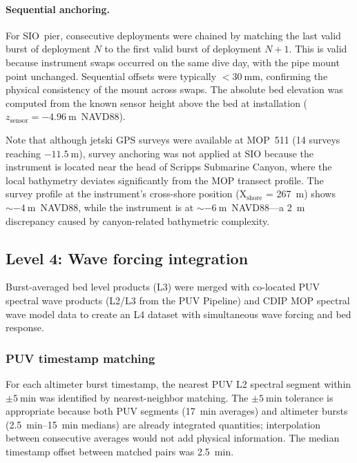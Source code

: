 \paragraph{Sequential anchoring.} For SIO~pier, consecutive deployments
were chained by matching the last valid burst of deployment $N$ to the
first valid burst of deployment $N{+}1$. This is valid because
instrument swaps occurred on the same dive day, with the pipe mount
point unchanged. Sequential offsets were typically
$< \SI{30}{\milli\meter}$, confirming the physical consistency of the
mount across swaps. The absolute bed elevation was computed from the
known sensor height above the bed at installation
($z_\text{sensor} = \SI{-4.96}{\meter}$~NAVD88).

Note that although jetski GPS surveys were available at MOP~511 (14
surveys reaching $-\SI{11.5}{\meter}$), survey anchoring was not
applied at SIO because the instrument is located near the head of
Scripps Submarine Canyon, where the local bathymetry deviates
significantly from the MOP transect profile. The survey profile at
the instrument's cross-shore position (X$_\text{shore}$ =
\SI{267}{\meter}) shows $\sim \SI{-4}{\meter}$~NAVD88, while the
instrument is at $\sim \SI{-6}{\meter}$~NAVD88---a \SI{2}{\meter}
discrepancy caused by canyon-related bathymetric complexity.

\subsection{Level 4: Wave forcing integration}

Burst-averaged bed level products (L3) were merged with co-located
PUV spectral wave products (L2/L3 from the PUV Pipeline) and CDIP
MOP spectral wave model data to create an L4 dataset with
simultaneous wave forcing and bed response.

\subsubsection{PUV timestamp matching}

For each altimeter burst timestamp, the nearest PUV L2 spectral
segment within $\pm \SI{5}{\minute}$ was identified by
nearest-neighbor matching. The $\pm \SI{5}{\minute}$ tolerance is
appropriate because both PUV segments (\SI{17}{\minute} averages)
and altimeter bursts (\SIrange{2.5}{15}{\minute} medians) are
already integrated quantities; interpolation between consecutive
averages would not add physical information. The median timestamp
offset between matched pairs was \SI{2.5}{\minute}.


